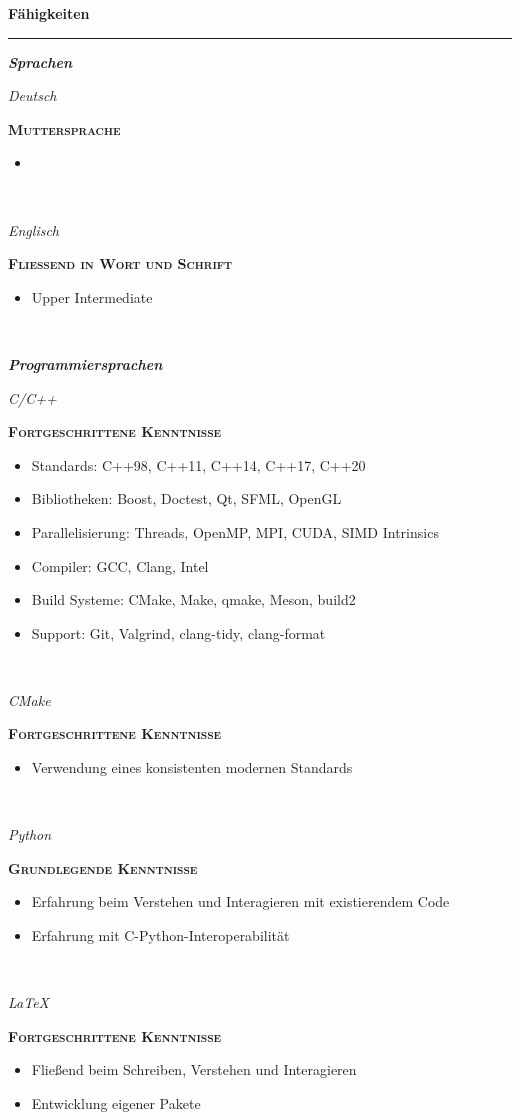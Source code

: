 \documentclass[8pt]{article}
\newcommand{\cvSectionStyle}{%
  \normalfont%
  \Large%
  \color{cvColor}%
  \bfseries%
  \sffamily%
}
\newcommand{\cvSubsectionStyle}{%
  \normalfont%
  \sffamily%
  \itshape%
  \bfseries%
}
\newcommand{\cvSection}[1]{%
  \smallskip%
  {%
    \cvSectionStyle #1%
  }\\[-0.5em]
  \rule{\linewidth}{0.8pt}%
  \par%
  \smallskip%
}
\newcommand{\cvSubsection}[1]{%
  \begin{tcolorbox}[left=0pt, top=0pt, bottom=0pt, right=0pt, boxsep=5pt, arc=5pt, frame code={}, colback=cvBackgroundColor]
    \cvSubsectionStyle #1%
  \end{tcolorbox}
}
\newenvironment{cvEducationItem}[2]{
  \par
  \begin{minipage}[c]{0.15\linewidth}
    \raggedleft
    \footnotesize
    \textit{#1}
  \end{minipage}
  \quad
  \vrule
  \quad
  \begin{minipage}[t]{0.7\linewidth}
    \textsc{\color{cvColor} \textbf{#2}}
    \footnotesize
    \begin{itemize}[itemsep=0mm, leftmargin=3mm]
}{
    \end{itemize}
  \end{minipage}
  \\[0.5em]
}
\begin{document}
  \cvSection{Fähigkeiten}
  \cvSubsection{Sprachen}
  \vspace{-1.8em}
  \begin{multicols}{2}
  \begin{cvEducationItem}{Deutsch}{Muttersprache}
    \item
  \end{cvEducationItem}
  \begin{cvEducationItem}{Englisch}{Fließend in Wort und Schrift}
    \item Upper Intermediate
  \end{cvEducationItem}
  \end{multicols}
  \vspace{-1.8em}

  \cvSubsection{Programmiersprachen}
  \vspace{-1.8em}
  \begin{multicols}{2}
  \begin{cvEducationItem}{C/C++}{Fortgeschrittene Kenntnisse}
    \item Standards: C++98, C++11, C++14, C++17, C++20
    \item Bibliotheken: Boost, Doctest, Qt, SFML, OpenGL
    \item Parallelisierung: Threads, OpenMP, MPI, CUDA, SIMD Intrinsics
    \item Compiler: GCC, Clang, Intel
    \item Build Systeme: CMake, Make, qmake, Meson, build2
    \item Support: Git, Valgrind, clang-tidy, clang-format
  \end{cvEducationItem}
  \begin{cvEducationItem}{CMake}{Fortgeschrittene Kenntnisse}
    \item Verwendung eines konsistenten modernen Standards
  \end{cvEducationItem}
  \begin{cvEducationItem}{Python}{Grundlegende Kenntnisse}
    \item Erfahrung beim Verstehen und Interagieren mit existierendem Code
    \item Erfahrung mit C-Python-Interoperabilität
  \end{cvEducationItem}
  \begin{cvEducationItem}{LaTeX}{Fortgeschrittene Kenntnisse}
    \item Fließend beim Schreiben, Verstehen und Interagieren
    \item Entwicklung eigener Pakete
  \end{cvEducationItem}
  \end{multicols}
\end{document}
